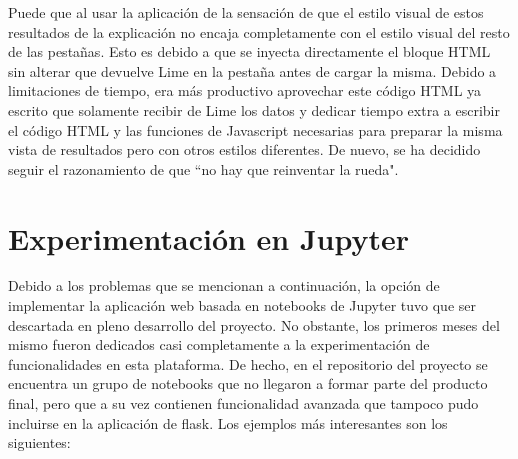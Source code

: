 Puede que al usar la aplicación de la sensación de que el estilo visual de estos resultados de la explicación no encaja completamente con el estilo visual del resto de las pestañas. Esto es debido a que se inyecta directamente el bloque HTML sin alterar que devuelve Lime en la pestaña antes de cargar la misma. Debido a limitaciones de tiempo, era más productivo aprovechar este código HTML ya escrito que solamente recibir de Lime los datos y dedicar tiempo extra a escribir el código HTML y las funciones de Javascript necesarias para preparar la misma vista de resultados pero con otros estilos diferentes. De nuevo, se ha decidido seguir el razonamiento de que ``no hay que reinventar la rueda".

\section{Experimentación en Jupyter}

Debido a los problemas que se mencionan a continuación, la opción de implementar la aplicación web basada en notebooks de Jupyter tuvo que ser descartada en pleno desarrollo del proyecto.
No obstante, los primeros meses del mismo fueron dedicados casi completamente a la experimentación de funcionalidades en esta plataforma. De hecho, en el repositorio del proyecto se encuentra un grupo de notebooks que no llegaron a formar parte del producto final, pero que a su vez contienen funcionalidad avanzada que tampoco pudo incluirse en la aplicación de flask. Los ejemplos más interesantes son los siguientes:

